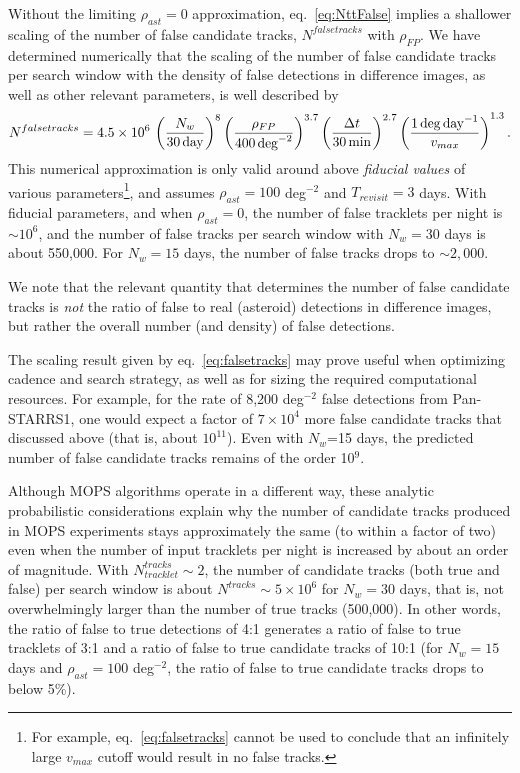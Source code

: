 Without the limiting $\rho_{ast}=0$  approximation, eq.~\ref{eq:NttFalse} implies a shallower scaling
of the number of false candidate tracks, $N^{falsetracks}$ with $\rho_{FP}$.
We have determined numerically that the scaling of the number
of false candidate tracks per search window with the density of false detections in difference
images, as well as other relevant parameters, is well described by
\begin{equation}
\label{eq:falsetracks}
   N^{falsetracks} = 4.5 \times 10^6 \, \left( {N_w \over 30 \, {\rm day} } \right)^{8} \left( {\rho_{FP} \over 400 \, {\rm deg}^{-2} }\right)^{3.7}
    \left( {\Delta t  \over 30 \, {\rm min}} \right)^{2.7}
     \left( { 1 \, {\rm deg} \, {\rm day}^{-1} \over v_{max} }  \right)^{1.3}.
\end{equation}
This numerical approximation is only valid around above {\it fiducial values} of various 
parameters\footnote{For example, eq.~\ref{eq:falsetracks} cannot be used to conclude that
an infinitely large $v_{max}$ cutoff would result in no false tracks.}, 
and assumes $\rho_{ast}=100$ deg$^{-2}$ and $T_{revisit}=3$ days. With fiducial parameters, and 
when $\rho_{ast}=0$, the number of false tracklets per night is $\sim10^6$, and the number of false 
tracks per search window with $N_w=30$ days is about 550,000. For $N_w=15$ days,  the number 
of false tracks drops to $\sim2,000$. 

We note that the relevant quantity that determines the number of false candidate tracks is {\it not}
the ratio of false to real (asteroid) detections in difference images, but rather the overall number 
(and density) of false detections.

The scaling result given by eq.~\ref{eq:falsetracks} may prove useful when optimizing cadence
and search strategy, as well as for sizing the required computational resources. For example,
for the rate of 8,200 deg$^{-2}$ false detections from Pan-STARRS1, one would expect a factor
of $7\times10^4$ more false candidate tracks that discussed above (that is, about $10^{11}$).
Even with $N_w$=15 days, the predicted number of false candidate tracks remains of the
order 10$^9$.

Although MOPS algorithms operate in a different way, these analytic probabilistic considerations
explain why the number of candidate tracks produced in MOPS experiments stays approximately
the same (to within a factor of two) even when the number of input tracklets per night is increased
by about an order of magnitude. With $N_{tracklet}^{tracks} \sim2$, the number of  candidate
tracks (both true and false) per search window is about $N^{tracks} \sim 5\times10^6$ for $N_w= 30$ days,
that is, not overwhelmingly larger than the number of true tracks (500,000). In other words, the ratio of
false to true detections of 4:1 generates a ratio of false to true tracklets of 3:1 and a ratio of false to true
candidate tracks of 10:1 (for $N_w=15$ days and $\rho_{ast}=100$ deg$^{-2}$, the ratio of false to true
candidate tracks drops to below 5\%).

